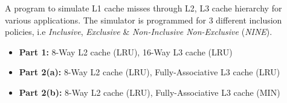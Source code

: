 

A program to simulate L1 cache misses through L2, L3 cache hierarchy for various applications. The
simulator is programmed for 3 different inclusion policies, i.e \textit{Inclusive}, \textit{Exclusive} \& \textit{Non-Inclusive Non-Exclusive} (\textit{NINE}).

\begin{itemize}
	\item \textbf{Part 1:} 8-Way L2 cache (LRU), 16-Way L3 cache (LRU)
	\item \textbf{Part 2(a):} 8-Way L2 cache (LRU), Fully-Associative L3 cache (LRU)
	\item \textbf{Part 2(b):} 8-Way L2 cache (LRU), Fully-Associative L3 cache (MIN)
\end{itemize}